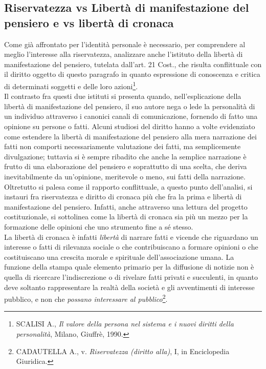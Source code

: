 \subsection{Riservatezza vs Libertà di manifestazione del pensiero e vs libertà di cronaca}%
Come già affrontato per l'identità personale è necessario, per comprendere al meglio l'interesse alla riservatezza, analizzare anche l'istituto della libertà di manifestazione del pensiero, tutelata dall'art. 21 Cost., che risulta conflittuale con il diritto oggetto di questo paragrafo in quanto espressione di conoscenza e critica di determinati soggetti e delle loro azioni\footnote{SCALISI A., \textit{Il valore della persona nel sistema e i nuovi diritti della personalità}, Milano, Giuffrè, 1990.}.\\Il contrasto fra questi due istituti si presenta quando, nell'esplicazione della libertà di manifestazione del pensiero, il suo autore nega o lede la personalità di un individuo attraverso i canonici canali di comunicazione, fornendo di fatto una opinione su persone o fatti. Alcuni studiosi del diritto hanno a volte evidenziato come estendere la libertà di manifestazione del pensiero alla mera narrazione dei fatti non comporti necessariamente valutazione dei fatti, ma semplicemente divulgazione; tuttavia si è sempre ribadito che anche la semplice narrazione è frutto di una elaborazione del pensiero e soprattutto di una scelta, che deriva inevitabilmente da un'opinione, meritevole o meno, sui fatti della narrazione. Oltretutto si palesa come il rapporto conflittuale, a questo punto dell'analisi, si instauri fra riservatezza e diritto di cronaca più che fra la prima e libertà di manifestazione del pensiero.
Infatti, anche attraverso una lettura del progetto costituzionale, si sottolinea come la libertà di cronaca sia più un mezzo per la formazione delle opinioni che uno strumento fine a sé stesso.
\\La libertà di cronaca è infatti \textit{libertà} di narrare fatti e vicende che riguardano un interesse o fatti di rilevanza sociale o che contribuiscano a formare opinioni o che costituiscano una crescita morale e spirituale dell'associazione umana.
La funzione della stampa quale elemento primario per la diffusione di notizie non è quella di ricercare l'indiscrezione o di rivelare fatti privati e succulenti, in quanto deve soltanto rappresentare la realtà della società e gli avventimenti di interesse pubblico, e non che \textit{possano interessare al pubblico}\footnote{CADAUTELLA A., v. \textit{Riservatezza (diritto alla)}, I, in Enciclopedia Giuridica.}. 
